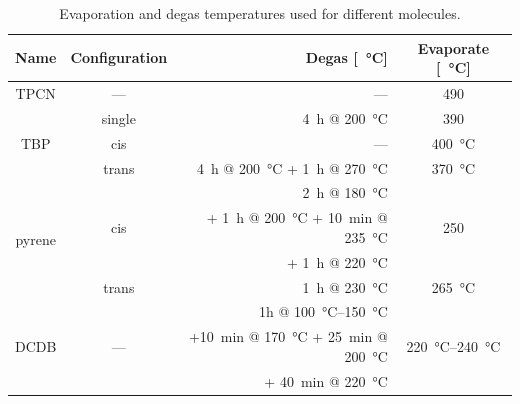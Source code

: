 \begin{table}\centering
	\caption{Evaporation and degas temperatures used for different molecules.}
	\begin{tabular}{ccrc}
		Name			& Configuration & Degas [\SI{}{\degreeCelsius}]	& Evaporate [\SI{}{\degreeCelsius}]	\\ \hline \hline 
		TPCN			& ---		& ---		& 490		\\ \hline 
		\multirow{3}{*}{TBP}	&single		& \SI{4}{\hour} @ \SI{200}{\degreeCelsius}& 390	\\
		&cis		& ---		& \SI{400}{\degreeCelsius}\\
		&trans		& \SI{4}{\hour} @ \SI{200}{\degreeCelsius} + \SI{1}{\hour} @ \SI{270}{\degreeCelsius}&\SI{370}{\degreeCelsius}\\ \hline 
		\multirow{4}{*}{pyrene} & \multirow{3}{*}{cis}		& \SI{2}{\hour} @ \SI{180}{\degreeCelsius}&	\multirow{3}{*}{250}	\\
		&&+ \SI{1}{\hour} @ \SI{200}{\degreeCelsius} + \SI{10}{\minute} @ \SI{235}{\degreeCelsius} 	&\\
		&&+ \SI{1}{\hour} @ \SI{220}{\degreeCelsius}&\\ 
		&trans		& \SI{1}{\hour} @ \SI{230}{\degreeCelsius}		&\SI{265}{\degreeCelsius}		\\ \hline
		\multirow{3}{*}{DCDB} & \multirow{3}{*}{---} & 1h @ \SIrange{100}{150}{\degreeCelsius}& \multirow{3}{*}{\SIrange{220}{240}{\degreeCelsius}}\\
		&&+\SI{10}{\minute} @ \SI{170}{\degreeCelsius} + \SI{25}{\minute} @ \SI{200}{\degreeCelsius} & \\
		&&+ \SI{40}{\minute} @ \SI{220}{\degreeCelsius}&\\
	\end{tabular}
	\label{tab:molecule-temperatures}
\end{table}